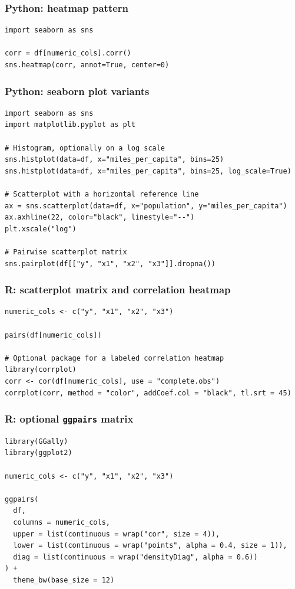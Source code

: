 \subsubsection*{Python: heatmap pattern}

\begin{verbatim}
import seaborn as sns

corr = df[numeric_cols].corr()
sns.heatmap(corr, annot=True, center=0)
\end{verbatim}

\subsubsection*{Python: seaborn plot variants}

\begin{verbatim}
import seaborn as sns
import matplotlib.pyplot as plt

# Histogram, optionally on a log scale
sns.histplot(data=df, x="miles_per_capita", bins=25)
sns.histplot(data=df, x="miles_per_capita", bins=25, log_scale=True)

# Scatterplot with a horizontal reference line
ax = sns.scatterplot(data=df, x="population", y="miles_per_capita")
ax.axhline(22, color="black", linestyle="--")
plt.xscale("log")

# Pairwise scatterplot matrix
sns.pairplot(df[["y", "x1", "x2", "x3"]].dropna())
\end{verbatim}

\subsubsection*{R: scatterplot matrix and correlation heatmap}

\begin{verbatim}
numeric_cols <- c("y", "x1", "x2", "x3")

pairs(df[numeric_cols])

# Optional package for a labeled correlation heatmap
library(corrplot)
corr <- cor(df[numeric_cols], use = "complete.obs")
corrplot(corr, method = "color", addCoef.col = "black", tl.srt = 45)
\end{verbatim}

\subsubsection*{R: optional \texttt{ggpairs} matrix}

\begin{verbatim}
library(GGally)
library(ggplot2)

numeric_cols <- c("y", "x1", "x2", "x3")

ggpairs(
  df,
  columns = numeric_cols,
  upper = list(continuous = wrap("cor", size = 4)),
  lower = list(continuous = wrap("points", alpha = 0.4, size = 1)),
  diag = list(continuous = wrap("densityDiag", alpha = 0.6))
) +
  theme_bw(base_size = 12)
\end{verbatim}


